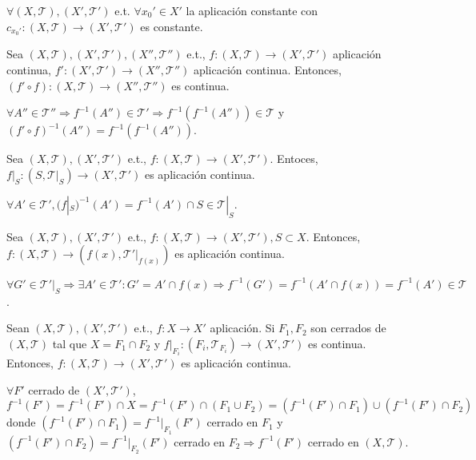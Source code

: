 \begin{obs}
  $\forall ( X, \mathcal{T} ), ( X', \mathcal{T}' )$ e.t. $\forall x_{0}' \in X'$ la aplicación constante con $c_{x_{0}'}: ( X, \mathcal{T} ) \to ( X', \mathcal{T}' )$ es constante.
\end{obs}

\begin{prop}
  Sea $( X, \mathcal{T} ), ( X', \mathcal{T}' ), ( X'', \mathcal{T}'' )$ e.t., $f: ( X, \mathcal{T} ) \to ( X', \mathcal{T}' )$ aplicación continua, $f': ( X', \mathcal{T}' ) \to ( X'', \mathcal{T}'' )$ aplicación continua. Entonces, $(f' \circ f): ( X, \mathcal{T} ) \to ( X'', \mathcal{T}'' )$ es continua.
\end{prop}

\begin{dem}
  $\forall A'' \in \mathcal{T''} \Rightarrow f^{-1}(A'') \in \mathcal{T}' \Rightarrow f^{-1}(f^{-1}(A'')) \in \mathcal{T}$ y $(f' \circ f)^{-1}(A'') = f^{-1}(f^{-1}(A''))$.
\end{dem}

\begin{prop}
  Sea $( X, \mathcal{T} ), ( X', \mathcal{T}' )$ e.t., $f: ( X, \mathcal{T} ) \to ( X', \mathcal{T}' )$. Entoces, $f|_{S}: ( S, \mathcal{T}|_{S} ) \to ( X', \mathcal{T}' )$ es aplicación continua.
\end{prop}

\begin{dem}
  $\forall A' \in \mathcal{T}', (f|_{S})^{-1}(A') = f^{-1}(A')\cap S \in \mathcal{T}|_{S}$.
\end{dem}

\begin{prop}
  Sea $( X, \mathcal{T} ), ( X', \mathcal{T}' )$ e.t., $f: ( X, \mathcal{T} ) \to ( X', \mathcal{T}' ), S \subset X$. Entonces, $f: ( X, \mathcal{T} ) \to ( f(x), \mathcal{T'}|_{f(x)})$ es aplicación continua.
\end{prop}

\begin{dem}
  $\forall G' \in \mathcal{T'}|_{S} \Rightarrow \exists A' \in \mathcal{T}': G' = A' \cap f(x) \Rightarrow f^{-1}(G') = f^{-1}(A' \cap f(x)) = f^{-1}(A') \in \mathcal{T}$.
\end{dem}

\begin{prop}
  Sean $( X, \mathcal{T} ), ( X', \mathcal{T}' )$ e.t., $f: X \to X'$ aplicación. Si $F_{1}, F_{2}$ son cerrados de $( X, \mathcal{T} )$ tal que $X = F_{1} \cap F_{2}$ y $f|_{F_{i}}: ( F_{i}, \mathcal{T}_{F_{i}}) \to ( X', \mathcal{T'} )$ es continua. Entonces, $f: ( X, \mathcal{T} ) \to ( X', \mathcal{T}' )$ es aplicación continua.
\end{prop}

\begin{dem}
  $\forall F'$ cerrado de $ ( X', \mathcal{T}' )$, $f^{-1}(F') =f^{-1}(F')\cap X = f^{-1}(F') \cap (F_{1} \cup F_{2}) = (f^{-1}(F')\cap F_{1}) \cup (f^{-1}(F')\cap F_{2})$ donde $(f^{-1}(F')\cap F_{1}) = f^{-1}|_{F_{1}}(F') $ cerrado en $F_{1}$ y $(f^{-1}(F')\cap F_{2}) = f^{-1}|_{F_{2}}(F')$ cerrado en $F_{2} \Rightarrow f^{-1}(F')$ cerrado en $( X, \mathcal{T} )$.
\end{dem}
